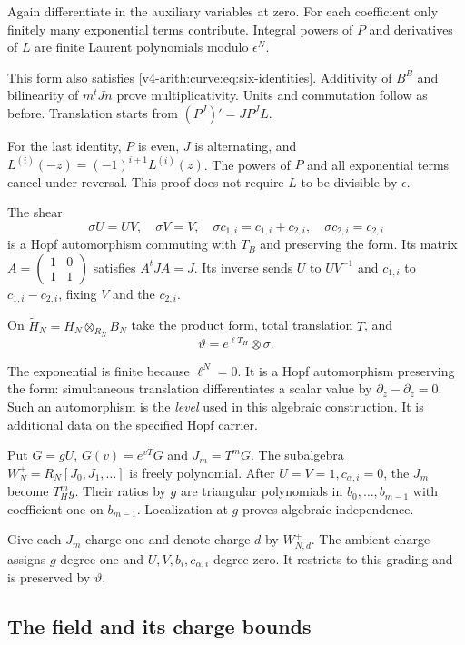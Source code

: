 Again differentiate in the auxiliary variables at zero.
For each coefficient only finitely many exponential terms
contribute. Integral powers of $P$ and derivatives of $L$
are finite Laurent polynomials modulo $\epsilon^N$.

This form also satisfies
\eqref{v4-arith:curve:eq:six-identities}.
Additivity of $B^B$ and bilinearity of $m^tJn$ prove
multiplicativity. Units and commutation follow as before.
Translation starts from $(P^J)'=JP^JL$.

For the last identity, $P$ is even, $J$ is alternating,
and $L^{(i)}(-z)=(-1)^{i+1}L^{(i)}(z)$.
The powers of $P$ and all exponential terms cancel under
reversal. This proof does not require $L$ to be divisible
by $\epsilon$.

The shear
\[
 \sigma U=UV,\quad \sigma V=V,\quad
 \sigma c_{1,i}=c_{1,i}+c_{2,i},\quad
 \sigma c_{2,i}=c_{2,i}
\]
is a Hopf automorphism commuting with $T_B$ and preserving
the form. Its matrix
$A=\left(\begin{smallmatrix}1&0\\1&1\end{smallmatrix}\right)$
satisfies $A^tJA=J$.
Its inverse sends $U$ to $UV^{-1}$ and $c_{1,i}$ to
$c_{1,i}-c_{2,i}$, fixing $V$ and the $c_{2,i}$.

On
$\widetilde H_N=H_N\otimes_{R_N}B_N$
take the product form, total translation $T$, and
\[
 \vartheta=e^{\ell T_H}\otimes\sigma .
\]

The exponential is finite because $\ell^N=0$.
It is a Hopf automorphism preserving the form:
simultaneous translation differentiates a scalar value by
$\partial_z-\partial_z=0$.
Such an automorphism is the \emph{level} used in this
algebraic construction. It is additional data on the
specified Hopf carrier.

Put $G=gU$, $G(v)=e^{vT}G$ and $J_m=T^mG$.
The subalgebra
$W_N^+=R_N[J_0,J_1,\ldots]$ is freely polynomial.
After $U=V=1,c_{\alpha,i}=0$, the $J_m$ become $T_H^mg$.
Their ratios by $g$ are triangular polynomials in
$b_0,\ldots,b_{m-1}$ with coefficient one on $b_{m-1}$.
Localization at $g$ proves algebraic independence.

Give each $J_m$ charge one and denote charge $d$ by
$W_{N,d}^+$.
The ambient charge assigns $g$ degree one and
$U,V,b_i,c_{\alpha,i}$ degree zero.
It restricts to this grading and is preserved by $\vartheta$.

\subsection{The field and its charge bounds}


